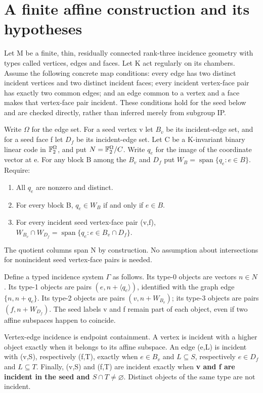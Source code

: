 \section{A finite affine construction and its
hypotheses}\label{a-finite-affine-construction-and-its-hypotheses}

Let M be a finite, thin, residually connected rank-three incidence
geometry with types called vertices, edges and faces. Let K act
regularly on its chambers. Assume the following concrete map conditions:
every edge has two distinct incident vertices and two distinct incident
faces; every incident vertex-face pair has exactly two common edges; and
an edge common to a vertex and a face makes that vertex-face pair
incident. These conditions hold for the seed below and are checked
directly, rather than inferred merely from subgroup IP.

Write \(\Omega\) for the edge set. For a seed vertex v let \(B_v\) be
its incident-edge set, and for a seed face f let \(D_f\) be its
incident-edge set. Let C be a K-invariant binary linear code in
\(\mathbb F_2^\Omega\), and put \(N=\mathbb F_2^\Omega/C\). Write \(q_e\) for the
image of the coordinate vector at e. For any block B among the \(B_v\)
and \(D_f\) put \(W_B=\operatorname{span}\{q_e:e\in B\}\). Require:

\begin{enumerate}
\def\labelenumi{\arabic{enumi}.}
\tightlist
\item
  All \(q_e\) are nonzero and distinct.
\item
  For every block B, \(q_e\in W_B\) if and only if \(e\in B\).
\item
  For every incident seed vertex-face pair (v,f),
  \(W_{B_v}\cap W_{D_f}=\operatorname{span}\{q_e:e\in B_v\cap D_f\}\).
\end{enumerate}

The quotient columns span N by construction. No assumption about
intersections for nonincident seed vertex-face pairs is needed.

Define a typed incidence system \(\Gamma\) as follows. Its type-0
objects are vectors \(n\in N\). Its type-1 objects are pairs
\((e,n+\langle q_e\rangle)\), identified with the graph edge
\(\{n,n+q_e\}\). Its type-2 objects are pairs \((v,n+W_{B_v})\); its
type-3 objects are pairs \((f,n+W_{D_f})\). The seed labels v and f
remain part of each object, even if two affine subspaces happen to
coincide.

Vertex-edge incidence is endpoint containment. A vertex is incident with
a higher object exactly when it belongs to its affine subspace. An edge
(e,L) is incident with (v,S), respectively (f,T), exactly when
\(e\in B_v\) and \(L\subseteq S\), respectively \(e\in D_f\) and
\(L\subseteq T\). Finally, (v,S) and (f,T) are incident exactly when
\textbf{v and f are incident in the seed and \(S\cap T\ne\varnothing\)}.
Distinct objects of the same type are not incident.

